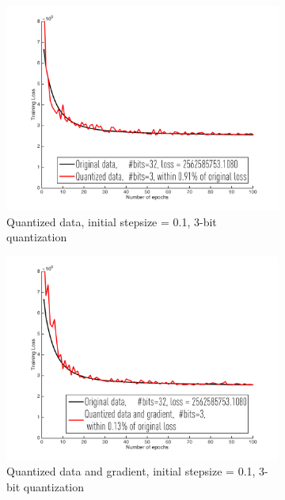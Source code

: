 \documentclass{article}
\begin{document}
\begin{figure}[h]
\centering

    \begin{subfigure}[h]{.3\columnwidth}
    \includegraphics[width=\columnwidth]{lr/real/cadata/d01}
    \caption{Quantized data, initial stepsize = 0.1, 3-bit quantization}
    \end{subfigure}
    \begin{subfigure}[h]{.3\columnwidth}
    \includegraphics[width=\columnwidth]{lr/real/cadata/dg01}
    \caption{Quantized data and gradient, initial stepsize = 0.1, 3-bit quantization}
    \end{subfigure}
    \begin{subfigure}[h]{.3\columnwidth}

\end{subfigure}
\end{figure}
\end{document}
